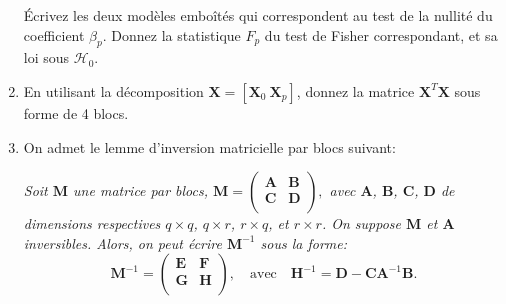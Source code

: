 \documentclass{../headers/td_upc}
\providecommand{\1}{\mathds{1}}
\begin{document}
\begin{enumerate}
  Écrivez les deux modèles emboîtés qui correspondent au test 
  de la nullité du coefficient $\beta_p$.
  Donnez la statistique $F_p$ du test de Fisher correspondant, 
  et sa loi sous $\mathcal{H}_{0}$.
  
  
  \item En utilisant la décomposition $\mathbf{X} = \left[\mathbf{X}_{0} \  \mathbf{X}_{p}\right]$,
  donnez la matrice $\mathbf{X}^T \mathbf{X}$ sous forme de 4 blocs.
  
  
  \item On admet le lemme d'inversion matricielle par blocs suivant:
  
  \textit{
  Soit $\mathbf{M}$ une matrice par blocs,
  $\mathbf{M} = 
  \begin{pmatrix}
  \mathbf{A} & \mathbf{B}\\
  \mathbf{C} & \mathbf{D}\\
  \end{pmatrix},$
  avec $\mathbf{A}$, $\mathbf{B}$, $\mathbf{C}$, $\mathbf{D}$ de dimensions
  respectives $q \times q$, $q \times r$, $r \times q$, et $r \times r$.
  On suppose $\mathbf{M}$ et $\mathbf{A}$ inversibles.
  Alors, on peut écrire $\mathbf{M}^{-1}$ sous la forme:
  $$
  \mathbf{M}^{-1} =
  \begin{pmatrix}
  \mathbf{E} & \mathbf{F}\\
  \mathbf{G} & \mathbf{H}\\
  \end{pmatrix},
  \quad
  \text{avec}
  \quad
  \mathbf{H}^{-1} = \mathbf{D} -  \mathbf{C}\mathbf{A}^{-1}\mathbf{B}.
  $$
  }
  

\end{enumerate}
\end{document}
